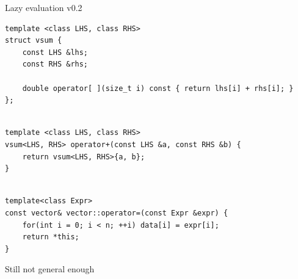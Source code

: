 \documentclass[@BEAMER_OPTIONS@]{beamer}
\begin{document}
\note{ }

\begin{frame}[fragile,shrink=2]{Lazy evaluation v0.2}
    \begin{exampleblock}{}
        \begin{lstlisting}
template <class LHS, class RHS>
struct vsum {
    const LHS &lhs;
    const RHS &rhs;

    double operator[ ](size_t i) const { return lhs[i] + rhs[i]; }
};
        \end{lstlisting}
        \pause
        \begin{lstlisting}[firstnumber=last]

template <class LHS, class RHS>
vsum<LHS, RHS> operator+(const LHS &a, const RHS &b) {
    return vsum<LHS, RHS>{a, b};
}
        \end{lstlisting}
        \pause
        \begin{lstlisting}[firstnumber=last]

template<class Expr>
const vector& vector::operator=(const Expr &expr) {
    for(int i = 0; i < n; ++i) data[i] = expr[i];
    return *this;
}
        \end{lstlisting}
    \end{exampleblock}
\end{frame}

\note{ }

\begin{frame}{Still not general enough}
    \begin{figure}
    \end{figure}
\end{frame}
\end{document}
